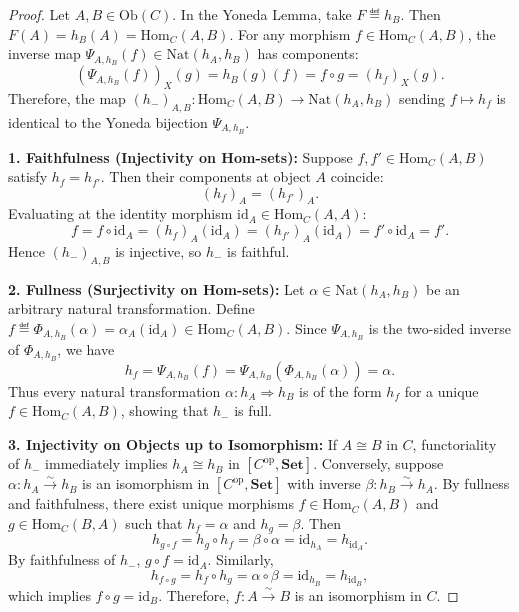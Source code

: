 \documentclass{article}
\newcommand{\Set}{\mathbf{Set}}
\newcommand{\Hom}{\mathrm{Hom}}
\newcommand{\Nat}{\mathrm{Nat}}
\newcommand{\op}{\mathrm{op}}
\newcommand{\Ob}{\mathrm{Ob}}
\newcommand{\id}{\mathrm{id}}
\begin{document}
\begin{proof}
Let $A, B \in \Ob(C)$. In the Yoneda Lemma, take $F \eqdef h_B$. Then $F(A) = h_B(A) = \Hom_C(A, B)$.
For any morphism $f \in \Hom_C(A, B)$, the inverse map $\Psi_{A, h_B}(f) \in \Nat(h_A, h_B)$ has components:
\[
(\Psi_{A, h_B}(f))_X(g) = h_B(g)(f) = f \circ g = (h_f)_X(g).
\]
Therefore, the map $(h_-)_{A, B} : \Hom_C(A, B) \to \Nat(h_A, h_B)$ sending $f \mapsto h_f$ is identical to the Yoneda bijection $\Psi_{A, h_B}$.

\medskip
\noindent\textbf{1. Faithfulness (Injectivity on Hom-sets):}
Suppose $f, f' \in \Hom_C(A, B)$ satisfy $h_f = h_{f'}$. Then their components at object $A$ coincide:
\[
(h_f)_A = (h_{f'})_A.
\]
Evaluating at the identity morphism $\id_A \in \Hom_C(A, A)$:
\[
f = f \circ \id_A = (h_f)_A(\id_A) = (h_{f'})_A(\id_A) = f' \circ \id_A = f'.
\]
Hence $(h_-)_{A, B}$ is injective, so $h_-$ is faithful.

\medskip
\noindent\textbf{2. Fullness (Surjectivity on Hom-sets):}
Let $\alpha \in \Nat(h_A, h_B)$ be an arbitrary natural transformation. Define $f \eqdef \Phi_{A, h_B}(\alpha) = \alpha_A(\id_A) \in \Hom_C(A, B)$.
Since $\Psi_{A, h_B}$ is the two-sided inverse of $\Phi_{A, h_B}$, we have
\[
h_f = \Psi_{A, h_B}(f) = \Psi_{A, h_B}(\Phi_{A, h_B}(\alpha)) = \alpha.
\]
Thus every natural transformation $\alpha : h_A \Rightarrow h_B$ is of the form $h_f$ for a unique $f \in \Hom_C(A, B)$, showing that $h_-$ is full.

\medskip
\noindent\textbf{3. Injectivity on Objects up to Isomorphism:}
If $A \cong B$ in $C$, functoriality of $h_-$ immediately implies $h_A \cong h_B$ in $[C^\op, \Set]$.
Conversely, suppose $\alpha : h_A \xrightarrow{\sim} h_B$ is an isomorphism in $[C^\op, \Set]$ with inverse $\beta : h_B \xrightarrow{\sim} h_A$.
By fullness and faithfulness, there exist unique morphisms $f \in \Hom_C(A, B)$ and $g \in \Hom_C(B, A)$ such that $h_f = \alpha$ and $h_g = \beta$.
Then
\[
h_{g \circ f} = h_g \circ h_f = \beta \circ \alpha = \id_{h_A} = h_{\id_A}.
\]
By faithfulness of $h_-$, $g \circ f = \id_A$. Similarly,
\[
h_{f \circ g} = h_f \circ h_g = \alpha \circ \beta = \id_{h_B} = h_{\id_B},
\]
which implies $f \circ g = \id_B$. Therefore, $f : A \xrightarrow{\sim} B$ is an isomorphism in $C$.
\end{proof}
\end{document}
